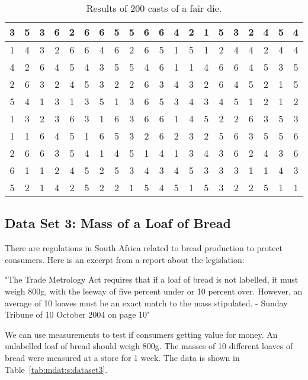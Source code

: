 \documentclass[10pt,a4paper,titlepage,twoside,openright]{report}
\begin{document}
\begin{table}[htb]
\begin{center}
\begin{tabular}{|c|c|c|c|c|c|c|c|c|c|c|c|c|c|c|c|c|c|c|c|}\hline
3 & 5 & 3 & 6 & 2 & 6 & 6 & 5 & 5 & 6 & 6 & 4 & 2 & 1 & 5 & 3 & 2 & 4 & 5 & 4\\\hline
1 & 4 & 3 & 2 & 6 & 6 & 4 & 6 & 2 & 6 & 5 & 1 & 5 & 1 & 2 & 4 & 4 & 2 & 4 & 4\\\hline
4 & 2 & 6 & 4 & 5 & 4 & 3 & 5 & 5 & 4 & 6 & 1 & 1 & 4 & 6 & 6 & 4 & 5 & 3 & 5\\\hline
2 & 6 & 3 & 2 & 4 & 5 & 3 & 2 & 2 & 6 & 3 & 4 & 3 & 2 & 6 & 4 & 5 & 2 & 1 & 5\\\hline
5 & 4 & 1 & 3 & 1 & 3 & 5 & 1 & 3 & 6 & 5 & 3 & 4 & 3 & 4 & 5 & 1 & 2 & 1 & 2\\\hline
1 & 3 & 2 & 3 & 6 & 3 & 1 & 6 & 3 & 6 & 6 & 1 & 4 & 5 & 2 & 2 & 6 & 3 & 5 & 3\\\hline
1 & 1 & 6 & 4 & 5 & 1 & 6 & 5 & 3 & 2 & 6 & 2 & 3 & 2 & 5 & 6 & 3 & 5 & 5 & 6\\\hline
2 & 6 & 6 & 3 & 5 & 4 & 1 & 4 & 5 & 1 & 4 & 1 & 3 & 4 & 3 & 6 & 2 & 4 & 3 & 6\\\hline
6 & 1 & 1 & 2 & 4 & 5 & 2 & 5 & 3 & 4 & 3 & 4 & 5 & 3 & 3 & 3 & 1 & 1 & 4 & 3\\\hline
5 & 2 & 1 & 4 & 2 & 5 & 2 & 2 & 1 & 5 & 4 & 5 & 1 & 5 & 3 & 2 & 2 & 5 & 1 & 1\\\hline
\end{tabular}
\end{center}
\caption{Results of 200 casts of a fair die.}
\label{tab:mdat:s:dataset2}
\end{table}

\subsection{Data Set 3: Mass of a Loaf of Bread}
\label{mdat:s:ed:dataset3}

There are regulations in South Africa related to bread production to protect consumers. Here is an excerpt from a report about the legislation:

"The Trade Metrology Act requires that if a loaf of bread is not labelled, it must weigh 800g, with the leeway of five percent under or 10 percent over. However, an average of 10 loaves must be an exact match to the mass stipulated. - Sunday Tribune of 10 October 2004 on page 10"

We can use measurements to test if consumers getting value for money. An unlabelled loaf of bread should weigh 800g. The masses of 10 different loaves of bread were measured at a store for 1 week. The data is shown in Table~\ref{tab:mdat:s:dataset3}.
\end{document}
